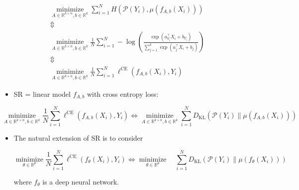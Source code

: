 \begin{concept}
    $$
    \begin{gathered}
    \underset{A \in \mathbb{R}^{k \times n}, b \in \mathbb{R}^{k}}{\operatorname{minimize}} \sum_{i=1}^{N} H\left(\mathcal{P}\left(Y_{i}\right), \mu\left(f_{A, b}\left(X_{i}\right)\right)\right) \\
    \mathbb{\Updownarrow} \\
    \underset{A \in \mathbb{R}^{k \times n}, b \in \mathbb{R}^{k}}{\operatorname{minimize}} \frac{1}{N} \sum_{i=1}^{N}-\log \left(\frac{\exp \left(a_{Y_{i}}^{\top} X_{i}+b_{Y_{i}}\right)}{\sum_{j=1}^{k} \exp \left(a_{j}^{\top} X_{i}+b_{j}\right)}\right) \\
    \mathbb{\Updownarrow} \\
    \underset{A \in \mathbb{R}^{k \times n}, b \in \mathbb{R}^{k}}{\operatorname{minimize}} \frac{1}{N} \sum_{i=1}^{N} \ell^{\mathrm{CE}}\left(f_{A, b}\left(X_{i}\right), Y_{i}\right)
    \end{gathered}
    $$

    \begin{itemize}
        \item SR = linear model $f_{A, b}$ with cross entropy loss:
    \end{itemize}

    $$
    \underset{A \in \mathbb{R}^{k \times n}, b \in \mathbb{R}^{k}}{\operatorname{minimize}} \frac{1}{N} \sum_{i=1}^{N} \ell^{\mathrm{CE}}\left(f_{A, b}\left(X_{i}\right), Y_{i}\right) \Longleftrightarrow \underset{A \in \mathbb{R}^{k \times n}, b \in \mathbb{R}^{k}}{\operatorname{minimize}} \sum_{i=1}^{N} D_{\mathrm{KL}}\left(\mathcal{P}\left(Y_{i}\right) \| \mu\left(f_{A, b}\left(X_{i}\right)\right)\right)
    $$

    \begin{itemize}
        \item
        The natural extension of SR is to consider

        $$
        \underset{\theta \in \mathbb{R}^{p}}{\operatorname{minimize}} \frac{1}{N} \sum_{i=1}^{N} \ell^{\mathrm{CE}}\left(f_{\theta}\left(X_{i}\right), Y_{i}\right) \Leftrightarrow \underset{\theta \in \mathbb{R}^{p}}{\operatorname{minimize}} \quad \sum_{i=1}^{N} D_{\mathrm{KL}}\left(\mathcal{P}\left(Y_{i}\right) \| \mu\left(f_{\theta}\left(X_{i}\right)\right)\right)
        $$

        where $f_{\theta}$ is a deep neural network.
    \end{itemize}
\end{concept}

